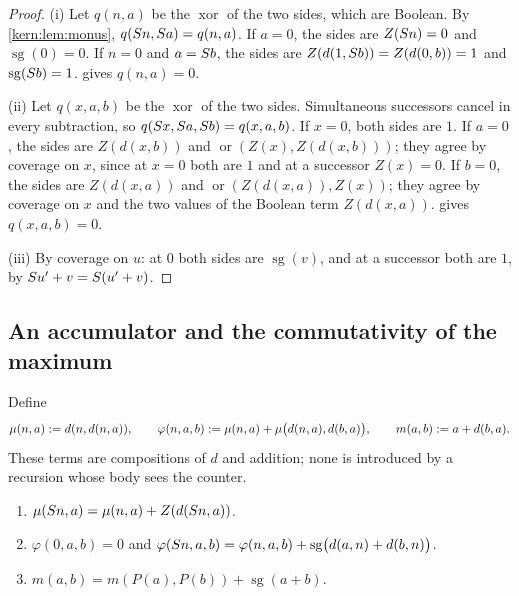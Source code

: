 \begin{proof}
(i) Let $q(n,a)$ be the $\operatorname{xor}$ of the two sides, which are
Boolean.  By \cref{kern:lem:monus}, $q(S n,S a)=q(n,a)$.  If $a=0$,
the sides are $Z(S n)=0$ and $\operatorname{sg}(0)=0$.  If $n=0$ and
$a=S b$, the sides are $Z(d(1,S b))=Z(d(0,b))=1$ and
$\operatorname{sg}(S b)=1$.   gives $q(n,a)=0$.

(ii) Let $q(x,a,b)$ be the $\operatorname{xor}$ of the two sides.
Simultaneous successors cancel in every subtraction, so
$q(S x,S a,S b)=q(x,a,b)$.  If $x=0$, both sides are $1$.  If
$a=0$, the sides are $Z(d(x,b))$ and
$\operatorname{or}(Z(x),Z(d(x,b)))$; they agree by coverage on $x$, since
at $x=0$ both are $1$ and at a successor $Z(x)=0$.  If $b=0$, the sides
are $Z(d(x,a))$ and $\operatorname{or}(Z(d(x,a)),Z(x))$; they agree by
coverage on $x$ and the two values of the Boolean term $Z(d(x,a))$.
 gives $q(x,a,b)=0$.

(iii) By coverage on $u$: at $0$ both sides are $\operatorname{sg}(v)$,
and at a successor both are $1$, by $S u'+v=S(u'+v)$.
\end{proof}

\subsection{An accumulator and the commutativity of the maximum}
\label{kern:sec:uracc}

Define
\[
 \mu(n,a)\mathrel{:=} d(n,d(n,a)),\qquad
 \varphi(n,a,b)\mathrel{:=}\mu(n,a)+\mu\bigl(d(n,a),d(b,a)\bigr),\qquad
 m(a,b)\mathrel{:=} a+d(b,a).
\]
These terms are compositions of $d$ and addition; none is introduced by a
recursion whose body sees the counter.

\begin{lemma}
\label{kern:lem:acc}
\begin{enumerate}[label=\textup{(\roman*)}]
\item $\mu(S n,a)=\mu(n,a)+Z(d(S n,a))$.
\item $\varphi(0,a,b)=0$ and
 $\varphi(S n,a,b)=\varphi(n,a,b)+\operatorname{sg}\bigl(d(a,n)+d(b,n)\bigr)$.
\item $m(a,b)=m(P(a),P(b))+\operatorname{sg}(a+b)$.
\end{enumerate}
\end{lemma}

